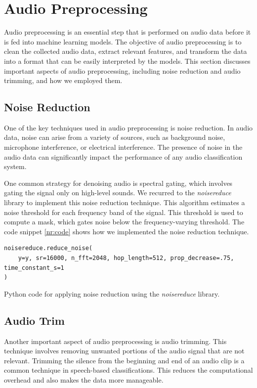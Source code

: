 \section{Audio Preprocessing}


Audio preprocessing is an essential step that is performed on audio data before it is fed into machine learning models. The objective of audio preprocessing is to clean the collected audio data, extract relevant features, and transform the data into a format that can be easily interpreted by the models. This section discusses important aspects of audio preprocessing, including noise reduction and audio trimming, and how we employed them.

\subsection{Noise Reduction}

One of the key techniques used in audio preprocessing is noise reduction. In audio data, noise can arise from a variety of sources, such as background noise, microphone interference, or electrical interference. The presence of noise in the audio data can significantly impact the performance of any audio classification system.

One common strategy for denoising audio is spectral gating, which involves gating the signal only on high-level sounds. We recurred to the \textit{noisereduce} library to implement this noise reduction technique.
This algorithm estimates a noise threshold for each frequency band of the signal. This threshold is used to compute a mask, which gates noise below the frequency-varying threshold. The code snippet \ref{nr:code} shows how we implemented the noise reduction technique.

\begin{listing}[H]
	\begin{verbatim}
noisereduce.reduce_noise(
	y=y, sr=16000, n_fft=2048, hop_length=512, prop_decrease=.75, time_constant_s=1
)
	\end{verbatim}
	\caption{Python code for applying noise reduction using the \textit{noisereduce} library.}
	\label{nr:code}
\end{listing}


\subsection{Audio Trim}

Another important aspect of audio preprocessing is audio trimming. This technique involves removing unwanted portions of the audio signal that are not relevant. Trimming the silence from the beginning and end of an audio clip is a common technique in speech-based classifications. This reduces the computational overhead and also makes the data more manageable.

